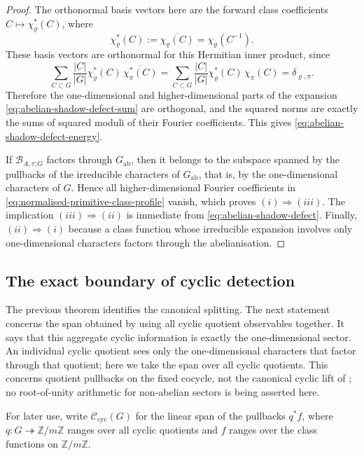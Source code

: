 \documentclass[11pt,a4paper]{amsart}
\theoremstyle{plain}
\theoremstyle{definition}
\theoremstyle{remark}
\newcommand{\ZZ}{\mathbb{Z}}
\begin{document}
\begin{proof}
  The orthonormal basis vectors here are the forward class coefficients
  \(C\mapsto \chi_\varrho^\ast(C)\), where
  \[
    \chi_\varrho^\ast(C):=\overline{\chi_\varrho(C)}
    =\chi_\varrho(C^{-1}).
  \]
  These basis vectors are orthonormal for this Hermitian inner product,
  since
  \[
    \sum_{C\subset G}\frac{|C|}{|G|}
      \chi_\varrho^\ast(C)\,\overline{\chi_\pi^\ast(C)}
    =
    \sum_{C\subset G}\frac{|C|}{|G|}
      \chi_\varrho^\ast(C)\,\chi_\pi(C)
    =
    \delta_{\varrho,\pi}.
  \]
  Therefore the one-dimensional and higher-dimensional parts of the
  expansion \eqref{eq:abelian-shadow-defect-sum} are orthogonal, and
  the squared norms are exactly the sums of squared moduli of their
  Fourier coefficients. This gives
  \eqref{eq:abelian-shadow-defect-energy}.

  If \(\mathcal B_{A,\tau;G}\) factors through \(G_{\mathrm{ab}}\), then it
  belongs to the subspace spanned by the pullbacks of the irreducible
  characters of \(G_{\mathrm{ab}}\), that is, by the one-dimensional
  characters of \(G\). Hence all higher-dimensional Fourier coefficients
  in \eqref{eq:normalised-primitive-class-profile} vanish, which proves
  \((i)\Rightarrow(iii)\). The implication \((iii)\Rightarrow(ii)\) is
  immediate from \eqref{eq:abelian-shadow-defect}. Finally,
  \((ii)\Rightarrow(i)\) because a class function whose irreducible
  expansion involves only one-dimensional characters factors through the
  abelianisation.
\end{proof}

\subsection{The exact boundary of cyclic detection}

The previous theorem identifies the canonical splitting. The next
statement concerns the span obtained by using all cyclic quotient
observables together. It says that this aggregate cyclic information is
exactly the one-dimensional sector. An individual cyclic quotient sees
only the one-dimensional characters that factor through that quotient;
here we take the span over all cyclic quotients. This concerns quotient
pullbacks on the fixed cocycle, not the canonical cyclic lift of
; no root-of-unity arithmetic for non-abelian sectors is
being asserted here.

For later use, write \(\mathscr C_{\mathrm{cyc}}(G)\) for the linear
span of the pullbacks \(q^\ast f\), where \(q:G\twoheadrightarrow \ZZ/m\ZZ\)
ranges over all cyclic quotients and \(f\) ranges over the class
functions on \(\ZZ/m\ZZ\).
\end{document}
